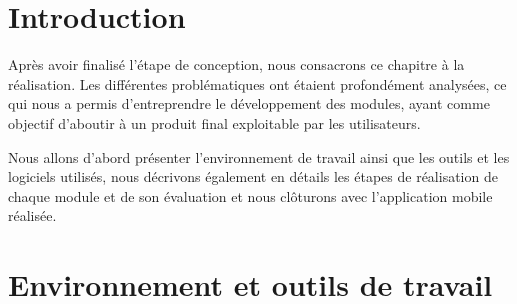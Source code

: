 
\newpage
\section{Introduction}
Après avoir finalisé l'étape de conception, nous consacrons ce chapitre à la réalisation. Les différentes problématiques ont étaient profondément analysées, ce qui nous a permis d'entreprendre le développement des modules, ayant comme objectif d'aboutir à un produit final exploitable par les utilisateurs.

Nous allons d'abord présenter l'environnement de travail ainsi que les outils et les logiciels utilisés, nous décrivons également en détails les étapes de réalisation de chaque module et de son évaluation et nous clôturons avec l'application mobile réalisée.

\section{Environnement et outils de travail}
